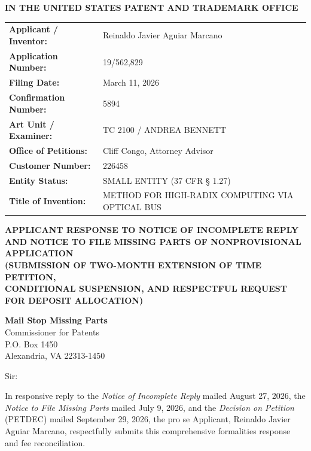 \documentclass[11pt,letterpaper]{article}
\begin{document}
\thispagestyle{empty}

\begin{center}
    \textbf{\large IN THE UNITED STATES PATENT AND TRADEMARK OFFICE}
\end{center}

\vspace{0.3cm}
\noindent\begin{tabular}{p{2.3in}p{4.0in}}
\textbf{Applicant / Inventor:} & Reinaldo Javier Aguiar Marcano \\
\textbf{Application Number:} & 19/562,829 \\
\textbf{Filing Date:} & March 11, 2026 \\
\textbf{Confirmation Number:} & 5894 \\
\textbf{Art Unit / Examiner:} & TC 2100 / ANDREA BENNETT \\
\textbf{Office of Petitions:} & Cliff Congo, Attorney Advisor \\
\textbf{Customer Number:} & 226458 \\
\textbf{Entity Status:} & SMALL ENTITY (37 CFR \S{} 1.27) \\
\textbf{Title of Invention:} & METHOD FOR HIGH-RADIX COMPUTING VIA OPTICAL BUS \\
\end{tabular}

\vspace{0.4cm}
\begin{center}
    \textbf{\large APPLICANT RESPONSE TO NOTICE OF INCOMPLETE REPLY \\
    AND NOTICE TO FILE MISSING PARTS OF NONPROVISIONAL APPLICATION} \\
    \textbf{\normalsize (SUBMISSION OF TWO-MONTH EXTENSION OF TIME PETITION, \\
    CONDITIONAL SUSPENSION, AND RESPECTFUL REQUEST FOR DEPOSIT ALLOCATION)}
\end{center}

\noindent\textbf{Mail Stop Missing Parts} \\
Commissioner for Patents \\
P.O. Box 1450 \\
Alexandria, VA 22313-1450

\vspace{0.2cm}
Sir:

In responsive reply to the \textit{Notice of Incomplete Reply} mailed August 27, 2026, the \textit{Notice to File Missing Parts} mailed July 9, 2026, and the \textit{Decision on Petition} (PETDEC) mailed September 29, 2026, the pro se Applicant, Reinaldo Javier Aguiar Marcano, respectfully submits this comprehensive formalities response and fee reconciliation.
\end{document}
